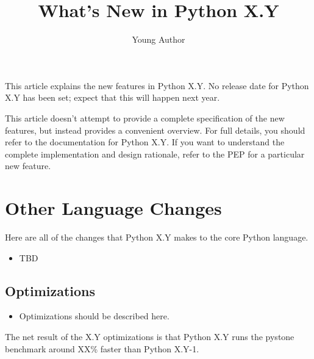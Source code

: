 \documentclass{howto}
\title{What's New in Python X.Y}
\author{Young Author}
\begin{document}
\maketitle
\tableofcontents

This article explains the new features in Python X.Y.  No release date
for Python X.Y has been set; expect that this will happen next year.


This article doesn't attempt to provide a complete specification of
the new features, but instead provides a convenient overview.  For
full details, you should refer to the documentation for Python X.Y.
If you want to understand the complete implementation and design
rationale, refer to the PEP for a particular new feature.





\section{Other Language Changes}

Here are all of the changes that Python X.Y makes to the core Python
language.

\begin{itemize}
\item TBD

\end{itemize}


\subsection{Optimizations}

\begin{itemize}

\item Optimizations should be described here.

\end{itemize}

The net result of the X.Y optimizations is that Python X.Y runs the
pystone benchmark around XX\% faster than Python X.Y-1.%
\end{document}
